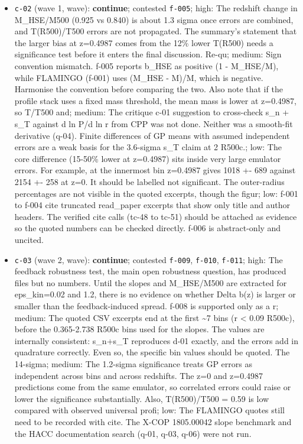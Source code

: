 \documentclass[11pt,a4paper]{article}
\begin{document}
\begin{itemize}
  \item \texttt{c-02} (wave 1, wave): \textbf{continue}; contested \texttt{f-005}; high: The redshift change in M\_HSE/M500 (0.925 vs 0.840) is about 1.3 sigma once errors are combined, and T(R500)/T500 errors are not propagated. The summary's statement that the larger bias at z=0.4987 comes from the 12\% lower T(R500) needs a significance test before it enters the final discussion. Re-qu; medium: Sign convention mismatch. f-005 reports b\_HSE as positive (1 - M\_HSE/M), while FLAMINGO (f-001) uses (M\_HSE - M)/M, which is negative. Harmonise the convention before comparing the two. Also note that if the profile stack uses a fixed mass threshold, the mean mass is lower at z=0.4987, so T/T500 and; medium: The critique c-01 suggestion to cross-check s\_n + s\_T against d ln P/d ln r from CPP was not done. Neither was a smooth-fit derivative (q-04). Finite differences of GP means with assumed independent errors are a weak basis for the 3.6-sigma s\_T claim at 2 R500c.; low: The core difference (15-50\% lower at z=0.4987) sits inside very large emulator errors. For example, at the innermost bin z=0.4987 gives 1018 +- 689 against 2154 +- 258 at z=0. It should be labelled not significant. The outer-radius percentages are not visible in the quoted excerpts, though the figur; low: f-001 to f-004 cite truncated read\_paper excerpts that show only title and author headers. The verified cite calls (tc-48 to tc-51) should be attached as evidence so the quoted numbers can be checked directly. f-006 is abstract-only and uncited.
  \item \texttt{c-03} (wave 2, wave): \textbf{continue}; contested \texttt{f-009}, \texttt{f-010}, \texttt{f-011}; high: The feedback robustness test, the main open robustness question, has produced files but no numbers. Until the slopes and M\_HSE/M500 are extracted for eps\_kin=0.02 and 1.2, there is no evidence on whether Delta b(z) is larger or smaller than the feedback-induced spread. f-008 is supported only as a r; medium: The quoted CSV excerpts end at the first \textasciitilde{}7 bins (r \textless{} 0.09 R500c), before the 0.365-2.738 R500c bins used for the slopes. The values are internally consistent: s\_n+s\_T reproduces d-01 exactly, and the errors add in quadrature correctly. Even so, the specific bin values should be quoted. The 14-sigma; medium: The 1.2-sigma significance treats GP errors as independent across bins and across redshifts. The z=0 and z=0.4987 predictions come from the same emulator, so correlated errors could raise or lower the significance substantially. Also, T(R500)/T500 = 0.59 is low compared with observed universal profi; low: The FLAMINGO quotes still need to be recorded with cite. The X-COP 1805.00042 slope benchmark and the HACC documentation search (q-01, q-03, q-06) were not run.

\end{itemize}
\end{document}
